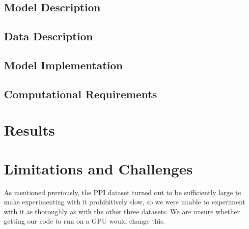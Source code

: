 \documentclass{article}
\begin{document}
    \subsection{Model Description}\label{subsec:model-description}
    

    \subsection{Data Description}\label{subsec:data-description}
    

    \subsection{Model Implementation}\label{subsec:model-implementation}
    

    \subsection{Computational Requirements}\label{subsec:computational-requirements}
    

    \section{Results}\label{sec:results}
    

    \section{Limitations and Challenges}\label{sec:limitations-and-challenges}
    As mentioned previously, the PPI dataset turned out to be sufficiently large to make experimenting with it prohibitively slow, so we were unable to experiment with it as thoroughly as with the other three datasets. We are unsure whether getting our code to run on a GPU would change this.

    
\end{document}
